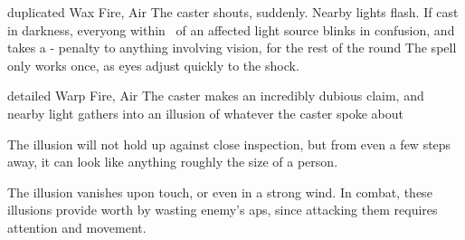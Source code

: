   {duplicated}%
  {Wax}%
  {Fire, Air}%
  {}%
  {The caster shouts, suddenly.
  Nearby lights flash.
  If cast in darkness, everyong within \spellRange\ of an affected light source blinks in confusion, and takes a - penalty to anything involving vision, for the rest of the round}%
  {The spell only works once, as eyes adjust quickly to the shock.}

  {detailed}%
  {Warp}%
  {Fire, Air}%
  {}%
  {The caster makes an incredibly dubious claim, and nearby light gathers into an illusion of whatever the caster spoke about}%
  {The illusion will not hold up against close inspection, but from even a few steps away, it can look like anything roughly the size of a person.

  The illusion vanishes upon touch, or even in a strong wind.
  In combat, these illusions provide worth by wasting enemy's \glspl{ap}, since attacking them requires attention and movement.}

